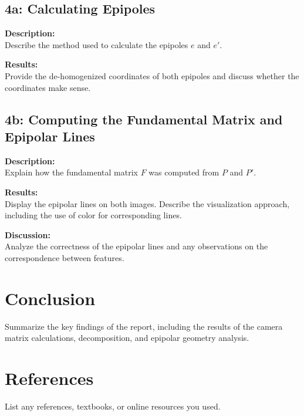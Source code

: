 \documentclass{article}
\begin{document}
\subsection{4a: Calculating Epipoles}
\textbf{Description:} \\
Describe the method used to calculate the epipoles \(e\) and \(e'\).

\textbf{Results:} \\
Provide the de-homogenized coordinates of both epipoles and discuss whether the coordinates make sense.

\subsection{4b: Computing the Fundamental Matrix and Epipolar Lines}
\textbf{Description:} \\
Explain how the fundamental matrix \(F\) was computed from \(P\) and \(P'\).

\textbf{Results:} \\
Display the epipolar lines on both images. Describe the visualization approach, including the use of color for corresponding lines.

\textbf{Discussion:} \\
Analyze the correctness of the epipolar lines and any observations on the correspondence between features.

\section{Conclusion}
Summarize the key findings of the report, including the results of the camera matrix calculations, decomposition, and epipolar geometry analysis.

\section{References}
List any references, textbooks, or online resources you used.
\end{document}
